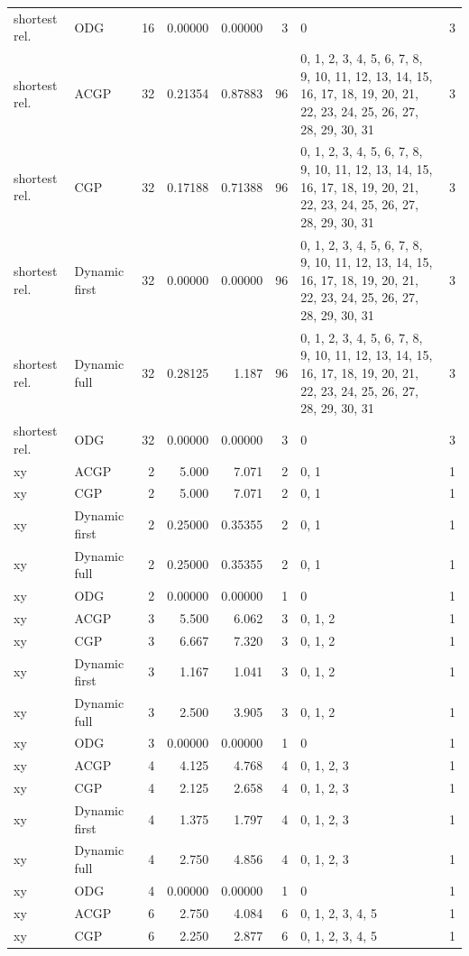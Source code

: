 \documentclass[10pt,a4paper]{article}
\begin{document}
\begin{longtable}{@{}p{23mm}p{29mm}rrrrp{36mm}r@{}}
shortest rel. & ODG & 16 & 0.00000 & 0.00000 & 3 & 0 & 3 \\
shortest rel. & ACGP & 32 & 0.21354 & 0.87883 & 96 & 0, 1, 2, 3, 4, 5, 6, 7, 8, 9, 10, 11, 12, 13, 14, 15, 16, 17, 18, 19, 20, 21, 22, 23, 24, 25, 26, 27, 28, 29, 30, 31 & 3 \\
shortest rel. & CGP & 32 & 0.17188 & 0.71388 & 96 & 0, 1, 2, 3, 4, 5, 6, 7, 8, 9, 10, 11, 12, 13, 14, 15, 16, 17, 18, 19, 20, 21, 22, 23, 24, 25, 26, 27, 28, 29, 30, 31 & 3 \\
shortest rel. & Dynamic first & 32 & 0.00000 & 0.00000 & 96 & 0, 1, 2, 3, 4, 5, 6, 7, 8, 9, 10, 11, 12, 13, 14, 15, 16, 17, 18, 19, 20, 21, 22, 23, 24, 25, 26, 27, 28, 29, 30, 31 & 3 \\
shortest rel. & Dynamic full & 32 & 0.28125 & 1.187 & 96 & 0, 1, 2, 3, 4, 5, 6, 7, 8, 9, 10, 11, 12, 13, 14, 15, 16, 17, 18, 19, 20, 21, 22, 23, 24, 25, 26, 27, 28, 29, 30, 31 & 3 \\
shortest rel. & ODG & 32 & 0.00000 & 0.00000 & 3 & 0 & 3 \\
xy & ACGP & 2 & 5.000 & 7.071 & 2 & 0, 1 & 1 \\
xy & CGP & 2 & 5.000 & 7.071 & 2 & 0, 1 & 1 \\
xy & Dynamic first & 2 & 0.25000 & 0.35355 & 2 & 0, 1 & 1 \\
xy & Dynamic full & 2 & 0.25000 & 0.35355 & 2 & 0, 1 & 1 \\
xy & ODG & 2 & 0.00000 & 0.00000 & 1 & 0 & 1 \\
xy & ACGP & 3 & 5.500 & 6.062 & 3 & 0, 1, 2 & 1 \\
xy & CGP & 3 & 6.667 & 7.320 & 3 & 0, 1, 2 & 1 \\
xy & Dynamic first & 3 & 1.167 & 1.041 & 3 & 0, 1, 2 & 1 \\
xy & Dynamic full & 3 & 2.500 & 3.905 & 3 & 0, 1, 2 & 1 \\
xy & ODG & 3 & 0.00000 & 0.00000 & 1 & 0 & 1 \\
xy & ACGP & 4 & 4.125 & 4.768 & 4 & 0, 1, 2, 3 & 1 \\
xy & CGP & 4 & 2.125 & 2.658 & 4 & 0, 1, 2, 3 & 1 \\
xy & Dynamic first & 4 & 1.375 & 1.797 & 4 & 0, 1, 2, 3 & 1 \\
xy & Dynamic full & 4 & 2.750 & 4.856 & 4 & 0, 1, 2, 3 & 1 \\
xy & ODG & 4 & 0.00000 & 0.00000 & 1 & 0 & 1 \\
xy & ACGP & 6 & 2.750 & 4.084 & 6 & 0, 1, 2, 3, 4, 5 & 1 \\
xy & CGP & 6 & 2.250 & 2.877 & 6 & 0, 1, 2, 3, 4, 5 & 1 \\

\end{longtable}
\end{document}
